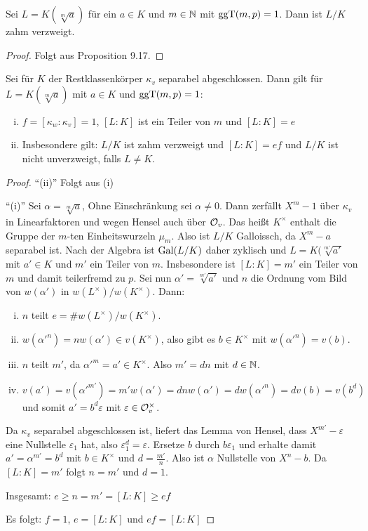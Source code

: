 \begin{Bsp}
	Sei $L=K(\sqrt[m]{a})$ für ein $a\in K$ und $m\in\mathbb{N}$ mit $\operatorname{ggT}(m,p) = 1$.
	Dann ist $L/K$ zahm verzweigt.
\end{Bsp}

\begin{proof}
	Folgt aus Proposition 9.17.
\end{proof}

\begin{Prop}
	Sei für $K$ der Restklassenkörper $\kappa_v$ separabel abgeschlossen. Dann gilt für $L=K(\sqrt[m]{a})$ mit $a\in K$ und $\operatorname{ggT}(m,p) = 1$:
	\begin{enumerate}[(i)]
		\item $f=[\kappa_w : \kappa_v] = 1$, $[L:K]$ ist ein Teiler von $m$ und $[L:K] = e$
		\item Insbesondere gilt: $L/K$ ist zahm verzweigt und $[L:K] = ef$ und $L/K$ ist nicht unverzweigt, falls $L\neq K$.
	\end{enumerate}
\end{Prop}

\begin{proof}
	\enquote{(ii)} Folgt aus (i)
	
	\bigskip \enquote{(i)} Sei $\alpha = \sqrt[m]{a}$, Ohne Einschränkung sei $\alpha \neq 0$.
	Dann zerfällt $X^m-1$ über $\kappa_v$ in Linearfaktoren und wegen Hensel auch über $\mathcal{O}_v$.
	Das heißt $K^\times$ enthalt die Gruppe der $m$-ten Einheitswurzeln $\mu_m$.
	Also ist $L/K$ Galloissch, da $X^m-a$ separabel ist.
	Nach der Algebra ist $\operatorname{Gal}(L/K)$ daher zyklisch und $L=K(\sqrt[m']{a'}$ mit $a'\in K$ und $m'$ ein Teiler von $m$. Insbesondere ist $[L:K] = m'$ ein Teiler von $m$ und damit teilerfremd zu $p$.
	Sei nun $\alpha' = \sqrt[m']{a'}$ und $n$ die Ordnung vom Bild von $w(\alpha')$ in 
	$w(L^\times) / w(K^\times)$. Dann:
	\begin{enumerate}[(i)]
		\item $n$ teilt $e= \# w(L^\times) / w(K^\times)$.
		\item $w(\alpha'^n) = nw(\alpha') \in v(K^\times)$, also gibt es $b\in K^\times$ mit
		$w(\alpha'^n) = v(b)$.
		\item $n$ teilt $m'$, da $\alpha'^m = a' \in K^\times$. Also $m'=dn$ mit $d\in\mathbb{N}$.
		\item $v(a')=v(\alpha'^{m'}) = m'w(\alpha') = dnw(\alpha') = dw(\alpha'^n)
		=dv(b)=v(b^d)$ und somit $a'=b^d \varepsilon$ mit $\varepsilon\in\mathcal{O}_v^\times$.
	\end{enumerate}
	Da $\kappa_v$ separabel abgeschlossen ist, liefert das Lemma von Hensel, dass $X^{m'}-\varepsilon$ eine Nullstelle $\varepsilon_1$ hat, also $\varepsilon_1^d = \varepsilon$.
	Ersetze $b$ durch $b \varepsilon_1$ und erhalte damit $a' = \alpha^{m'} = b^d$ mit $b\in K^\times$ und $d = \frac{m'}{n}$.
	Also ist $\alpha$ Nullstelle von $X^n-b$.
	Da $[L:K] = m'$ folgt $n=m'$ und $d=1$.
	
	\bigskip Insgesamt: $e \geq n = m' = [L:K] \geq ef$
	
	Es folgt: $f=1$, $e=[L:K]$ und $ef = [L:K]$
\end{proof}